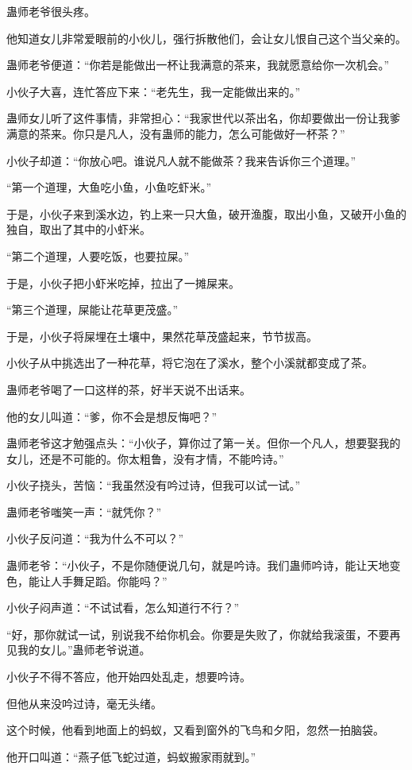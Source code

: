 \begin{this_body}
蛊师老爷很头疼。

他知道女儿非常爱眼前的小伙儿，强行拆散他们，会让女儿恨自己这个当父亲的。

蛊师老爷便道：“你若是能做出一杯让我满意的茶来，我就愿意给你一次机会。”

小伙子大喜，连忙答应下来：“老先生，我一定能做出来的。”

蛊师女儿听了这件事情，非常担心：“我家世代以茶出名，你却要做出一份让我爹满意的茶来。你只是凡人，没有蛊师的能力，怎么可能做好一杯茶？”

小伙子却道：“你放心吧。谁说凡人就不能做茶？我来告诉你三个道理。”

“第一个道理，大鱼吃小鱼，小鱼吃虾米。”

于是，小伙子来到溪水边，钓上来一只大鱼，破开渔腹，取出小鱼，又破开小鱼的独自，取出了其中的小虾米。

“第二个道理，人要吃饭，也要拉屎。”

于是，小伙子把小虾米吃掉，拉出了一摊屎来。

“第三个道理，屎能让花草更茂盛。”

于是，小伙子将屎埋在土壤中，果然花草茂盛起来，节节拔高。

小伙子从中挑选出了一种花草，将它泡在了溪水，整个小溪就都变成了茶。

蛊师老爷喝了一口这样的茶，好半天说不出话来。

他的女儿叫道：“爹，你不会是想反悔吧？”

蛊师老爷这才勉强点头：“小伙子，算你过了第一关。但你一个凡人，想要娶我的女儿，还是不可能的。你太粗鲁，没有才情，不能吟诗。”

小伙子挠头，苦恼：“我虽然没有吟过诗，但我可以试一试。”

蛊师老爷嗤笑一声：“就凭你？”

小伙子反问道：“我为什么不可以？”

蛊师老爷：“小伙子，不是你随便说几句，就是吟诗。我们蛊师吟诗，能让天地变色，能让人手舞足蹈。你能吗？”

小伙子闷声道：“不试试看，怎么知道行不行？”

“好，那你就试一试，别说我不给你机会。你要是失败了，你就给我滚蛋，不要再见我的女儿。”蛊师老爷说道。

小伙子不得不答应，他开始四处乱走，想要吟诗。

但他从来没吟过诗，毫无头绪。

这个时候，他看到地面上的蚂蚁，又看到窗外的飞鸟和夕阳，忽然一拍脑袋。

他开口叫道：“燕子低飞蛇过道，蚂蚁搬家雨就到。”


\end{this_body}
